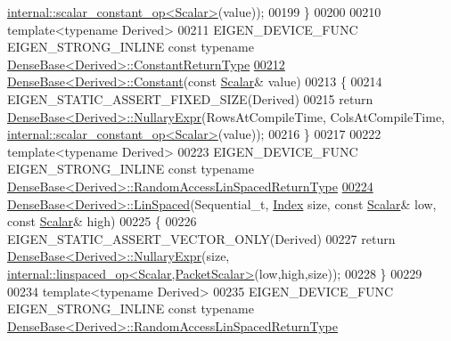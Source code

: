 \begin{DoxyCode}
      \hyperlink{struct_eigen_1_1internal_1_1scalar__constant__op}{internal::scalar\_constant\_op<Scalar>}(value));
00199 \}
00200 
00210 \textcolor{keyword}{template}<\textcolor{keyword}{typename} Derived>
00211 EIGEN\_DEVICE\_FUNC EIGEN\_STRONG\_INLINE \textcolor{keyword}{const} \textcolor{keyword}{typename} 
      \hyperlink{group___core___module_class_eigen_1_1_cwise_nullary_op}{DenseBase<Derived>::ConstantReturnType}
\hyperlink{group___core___module_a9053c1a2e9993febe50113b05aac0f20}{00212} \hyperlink{group___core___module_ab0ae1bfa72faedcaf53af81ca76c446b}{DenseBase<Derived>::Constant}(\textcolor{keyword}{const} \hyperlink{group___core___module_a5feed465b3a8e60c47e73ecce83e39a2}{Scalar}& value)
00213 \{
00214   EIGEN\_STATIC\_ASSERT\_FIXED\_SIZE(Derived)
00215   \textcolor{keywordflow}{return} \hyperlink{group___core___module_class_eigen_1_1_dense_base}{DenseBase<Derived>::NullaryExpr}(RowsAtCompileTime, 
      ColsAtCompileTime, \hyperlink{struct_eigen_1_1internal_1_1scalar__constant__op}{internal::scalar\_constant\_op<Scalar>}(value));
00216 \}
00217 
00222 \textcolor{keyword}{template}<\textcolor{keyword}{typename} Derived>
00223 EIGEN\_DEVICE\_FUNC EIGEN\_STRONG\_INLINE \textcolor{keyword}{const} \textcolor{keyword}{typename} 
      \hyperlink{group___core___module_class_eigen_1_1_cwise_nullary_op}{DenseBase<Derived>::RandomAccessLinSpacedReturnType}
\hyperlink{group___core___module_a35f222d8834f34fd358f2ef7bb52c888}{00224} \hyperlink{group___core___module_a35f222d8834f34fd358f2ef7bb52c888}{DenseBase<Derived>::LinSpaced}(Sequential\_t, \hyperlink{namespace_eigen_a62e77e0933482dafde8fe197d9a2cfde}{Index} size, \textcolor{keyword}{const} 
      \hyperlink{group___core___module_a5feed465b3a8e60c47e73ecce83e39a2}{Scalar}& low, \textcolor{keyword}{const} \hyperlink{group___core___module_a5feed465b3a8e60c47e73ecce83e39a2}{Scalar}& high)
00225 \{
00226   EIGEN\_STATIC\_ASSERT\_VECTOR\_ONLY(Derived)
00227   \textcolor{keywordflow}{return} \hyperlink{group___core___module_class_eigen_1_1_dense_base}{DenseBase<Derived>::NullaryExpr}(size, 
      \hyperlink{struct_eigen_1_1internal_1_1linspaced__op}{internal::linspaced\_op<Scalar,PacketScalar>}(low,high,size));
00228 \}
00229 
00234 \textcolor{keyword}{template}<\textcolor{keyword}{typename} Derived>
00235 EIGEN\_DEVICE\_FUNC EIGEN\_STRONG\_INLINE \textcolor{keyword}{const} \textcolor{keyword}{typename} 
      \hyperlink{group___core___module_class_eigen_1_1_cwise_nullary_op}{DenseBase<Derived>::RandomAccessLinSpacedReturnType}

\end{DoxyCode}

